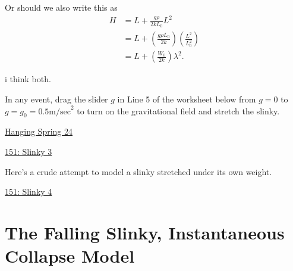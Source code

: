 \documentclass{ximera}
\begin{document}
Or should we also write this as
\begin{align*}
        H  & = L + \frac{g\rho}{2kL_0}L^2 \\
            & =  L + \left( \frac{g\rho L_0}{2k} \right) \left( \frac{L^2}{L_0^2} \right) \\
            & = L + \left( \frac{W_0}{2k} \right) \lambda^2 .
\end{align*}

i think both.

In any event, drag the slider $g$ in Line 5 of the worksheet below from $g=0$ to $g=g_0 = 0.5 \text{m/sec}^2$ to turn on the gravitational field and stretch the slinky. 

\begin{onlineOnly}
    \begin{center}
\end{center}
\end{onlineOnly}

\href{https://www.desmos.com/calculator/7kykohyoic}{Hanging Spring 24}



\begin{onlineOnly}
    \begin{center}
\end{center}
\end{onlineOnly}

\href{https://www.desmos.com/calculator/vjjibjkdrz}{151: Slinky 3}

Here's a crude attempt to model a slinky stretched under its own weight.

\begin{onlineOnly}
    \begin{center}
\end{center}
\end{onlineOnly}

\href{https://www.desmos.com/calculator/o1ny9elbie}{151: Slinky 4}


\section{The Falling Slinky, Instantaneous Collapse Model}




\begin{onlineOnly}
    \begin{center}
\end{center}
\end{onlineOnly}
\end{document}
